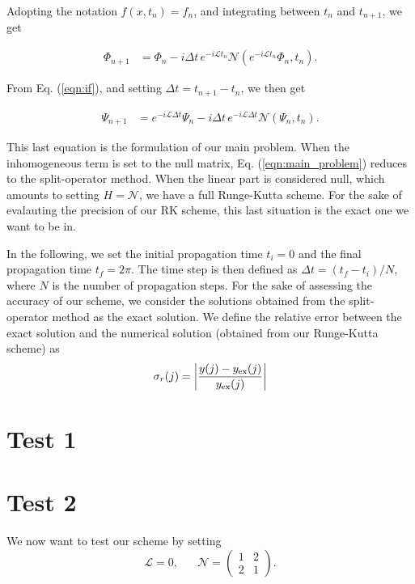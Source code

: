 \documentclass[10pt]{article}
\begin{document}
Adopting the notation $f(x,t_n) = f_n$, and integrating between $t_n$
and $t_{n+1}$, we get 

\begin{align}
     \Phi_{n+1} & = \Phi_{n} - i\Delta t\,e^{-i\mathcal{L}t_n}
          \mathcal{N}\left( e^{-i\mathcal{L}t_n} \Phi_n, t_n\right).
\end{align}

From Eq. (\ref{eqn:if}), and setting $\Delta t = {t_{n+1}-t_n}$, 
we then get

\begin{align}
     \Psi_{n+1} & = e^{-i\mathcal{L}\Delta t}\Psi_{n} 
          - i\Delta t\,e^{-i\mathcal{L}\Delta t} 
             \mathcal{N}\left(\Psi_n, t_n\right).
  \label{eqn:main_problem}
\end{align}

This last equation is the formulation of our main problem.
When the inhomogeneous term is set to the null matrix, 
Eq. (\ref{eqn:main_problem}) reduces to the split-operator method. 
When the linear part is considered null, which amounts to setting 
$H = \mathcal{N}$, we have a full Runge-Kutta scheme.
For the sake of evalauting the precision of our RK scheme, 
this last situation is the exact one we want to be in.


In the following, we set the initial propagation time $t_i = 0 $ and
the final propagation time $t_f = 2\pi$. The time step is then defined 
as $\Delta t = \left(t_f - t_i\right)/N$, where $N$ is the number of  
propagation steps. For the sake of assessing the accuracy of our scheme, 
we consider the solutions obtained from the split-operator method 
as the exact solution.
We define the relative error between the exact solution 
and the numerical solution (obtained from our Runge-Kutta scheme) as 
\begin{equation}
\sigma_r(j) = \left|\frac{y(j) - y_{\rm ex}(j)}{y_{\rm ex}(j)}\right|
\label{eqn:rel_err}
\end{equation}


\newpage
\section{Test 1}


\newpage
\section{Test 2}

We now want to test our scheme by setting 
\begin{equation}
\mathcal{L} = 0, \hspace{20pt}
\mathcal{N} = \left(
\begin{matrix}
 1 & 2 \\
 2 & 1 
\end{matrix}
\right).
\end{equation}
\end{document}
